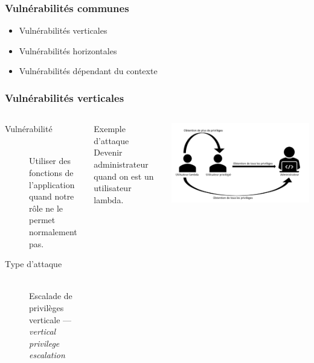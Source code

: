 \documentclass[aspectratio=169]{beamer}  %
\begin{document}
\begin{frame}
  \frametitle{Vulnérabilités communes}
  \begin{itemize}
    \item Vulnérabilités verticales
    \item Vulnérabilités horizontales
    \item Vulnérabilités dépendant du contexte
  \end{itemize}
\end{frame}
\begin{frame}
  \frametitle{Vulnérabilités verticales}
  \begin{columns}[c]
      \begin{description}
        \item[Vulnérabilité] \hfill \\ Utiliser des fonctions de l'application quand notre rôle ne le permet normalement pas.
        \item[Type d'attaque] \hfill \\ Escalade de privilèges verticale --- \emph{vertical privilege escalation}
      \end{description}
      \begin{block}{Exemple d'attaque}
        Devenir administrateur quand on est un utilisateur lambda.
      \end{block}
      \begin{center}
        \includegraphics[width=\textwidth]{escalade-vert}
      \end{center}
  \end{columns}
\end{frame}
\end{document}
